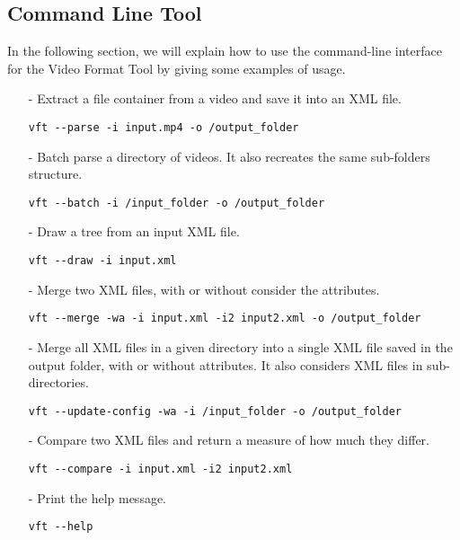 \subsection{Command Line Tool}

In the following section, we will explain how to use the command-line interface for the Video Format Tool by giving some examples of usage.

\begin{itemize}

\item[-] Extract a file container from a video and save it into an XML file.
\begin{lstlisting}
vft --parse -i input.mp4 -o /output_folder
\end{lstlisting}

\item[-] Batch parse a directory of videos. It also recreates the same sub-folders structure.
\begin{lstlisting}
vft --batch -i /input_folder -o /output_folder
\end{lstlisting}

\item[-] Draw a tree from an input XML file.
\begin{lstlisting}
vft --draw -i input.xml
\end{lstlisting}

\item[-] Merge two XML files, with or without consider the attributes.
\begin{lstlisting}
vft --merge -wa -i input.xml -i2 input2.xml -o /output_folder
\end{lstlisting}

\item[-] Merge all XML files in a given directory into a single XML file saved in the output folder, with or without attributes. It also considers XML files in sub-directories.
\begin{lstlisting}
vft --update-config -wa -i /input_folder -o /output_folder
\end{lstlisting}

\item[-] Compare two XML files and return a measure of how much they differ.
\begin{lstlisting}
vft --compare -i input.xml -i2 input2.xml
\end{lstlisting}

\item[-] Print the help message.
\begin{lstlisting}
vft --help
\end{lstlisting}

\end{itemize}


